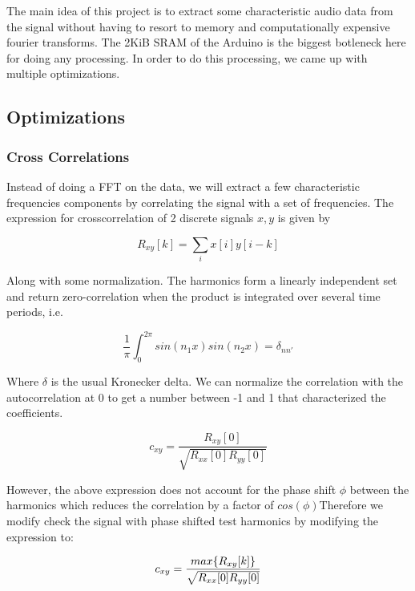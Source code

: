 
The main idea of this project is to extract some characteristic audio data from
the signal without having to resort to memory and computationally expensive
fourier transforms. The 2KiB SRAM of the Arduino is the biggest botleneck here
for doing any processing. In order to do this processing, we came up with
multiple optimizations. 

\subsection{Optimizations}

\subsubsection{Cross Correlations} 
Instead of doing a FFT on the data, we will extract a few characteristic
frequencies components by correlating the signal with a set of frequencies. The
expression for crosscorrelation of 2 discrete signals \(x,y\) is given by

\begin{equation}
    R_{xy}[k] = \sum_{i} x[i]y[i-k]
\end{equation}

Along with some normalization. The harmonics form a linearly independent set and
return zero-correlation when the product is integrated over several time periods,
i.e.

\begin{equation}
    \frac{1}{\pi} \int_0^{2\pi}sin(n_1x)sin(n_2x) = \delta_{nn'}  
\end{equation} 

Where \(\delta\) is the usual Kronecker delta. We can normalize the correlation
with the autocorrelation at 0 to get a number between -1 and 1 that
characterized the coefficients.

\begin{equation}
    c_{xy} = \frac{R_{xy}[0]}{\sqrt{R_{xx}[0]R_{yy}[0]} }
\end{equation} 

However, the above expression does not account for the phase shift \(\phi\)
between the harmonics which reduces the correlation by a factor of
\(cos(\phi)\)Therefore we modify check the signal with phase shifted test
harmonics by modifying the expression to:

\begin{equation}
    c_{xy} = \frac{\mathnormal{max}\{R_{xy}[k]\}}{\sqrt{R_{xx}[0]R_{yy}[0]} }
\end{equation}

